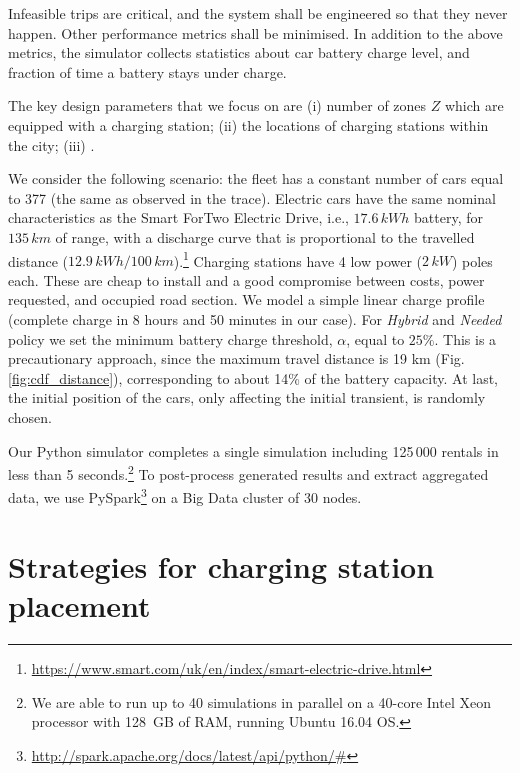 \documentclass[review, letterpaper,3p, 11pt]{elsarticle}
\newcommand{\github}{\url{https://github.com/michelelt/sim3.0}}
\newcommand{\trace}{\url{www.todo.com}}
\providecommand{\DIFaddtex}[1]{{\protect\color{blue}\uwave{#1}}} %
\providecommand{\DIFaddbegin}{} %
\providecommand{\DIFaddend}{} %
\providecommand{\DIFdelbegin}{} %
\providecommand{\DIFdelend}{} %
\providecommand{\DIFadd}[1]{\texorpdfstring{\DIFaddtex{#1}}{#1}} %
\providecommand{\DIFdel}[1]{} %
\begin{document}
Infeasible trips are critical, and the system shall be engineered so that they never happen. Other performance metrics shall be minimised. 
In addition to the above metrics, the simulator collects statistics about car battery charge level, and fraction of time a battery stays under charge. 

The key design parameters that we focus on are (i) number of zones $Z$ which are equipped with a charging station; (ii) the locations of charging stations within the city; (iii) \DIFdelbegin \DIFdel{return policies customers adopt}\DIFdelend \DIFaddbegin \DIFadd{adopted return policies}\DIFaddend .

We consider the following scenario: the fleet has a constant number of cars equal to 377 (the same as observed in the trace).  Electric cars have the same nominal characteristics as the Smart ForTwo Electric Drive, i.e., $17.6\,kWh$ battery, for $135\,km$ of range, with a discharge curve that is proportional to the travelled distance ($12.9\,kWh/100\,km$).\footnote{\url{https://www.smart.com/uk/en/index/smart-electric-drive.html}} 
Charging stations have 4 low power ($2\,kW$) poles each. These are cheap to install and a good compromise between costs, power requested, and occupied road section. We model a simple linear charge profile (complete charge in 8 hours and 50 minutes in our case).
For \textit{Hybrid} and \textit{Needed} policy we set the minimum battery charge threshold, $\alpha$, equal to $25\%$. This is a precautionary approach, since the maximum travel distance is 19 km (Fig. \ref{fig:cdf_distance}), corresponding to about 14\% of the battery capacity.
At last, the initial position of the cars, only affecting the initial transient, is randomly chosen.

Our Python simulator
completes a single simulation including 125\,000 rentals in less than 5 seconds.\footnote{We are able to run up to 40 simulations in parallel on a 40-core Intel Xeon 
processor with 128~GB of RAM, running Ubuntu 16.04 OS.} To post-process generated results and extract aggregated data,  we use PySpark\footnote{\url{http://spark.apache.org/docs/latest/api/python/\#}} on a Big Data cluster of 30 nodes. 


\section{Strategies for charging station placement}\label{sec:placement}
\end{document}
